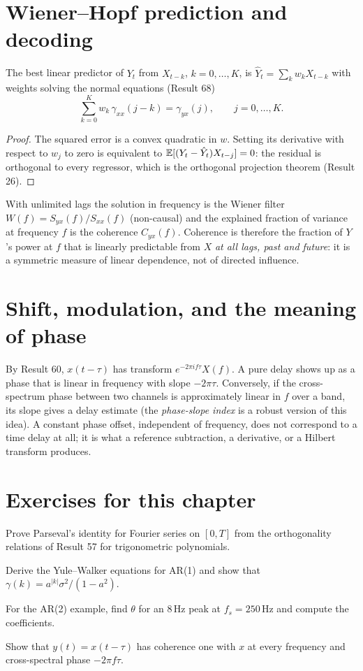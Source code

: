 \section{Wiener--Hopf prediction and decoding}
The best linear predictor of $Y_t$ from $X_{t-k}$, $k=0,\ldots,K$, is
$\hat Y_t=\sum_kw_kX_{t-k}$ with weights solving the normal equations
(Result 68)
\[
\sum_{k=0}^K w_k\,\gamma_{xx}(j-k)=\gamma_{yx}(j),\qquad j=0,\ldots,K.
\]
\begin{proof}
The squared error is a convex quadratic in $w$. Setting its derivative
with respect to $w_j$ to zero is equivalent to
$\mathbb{E}[(Y_t-\hat Y_t)X_{t-j}]=0$: the residual is orthogonal to every
regressor, which is the orthogonal projection theorem (Result 26).
\end{proof}
With unlimited lags the solution in frequency is the Wiener filter
$W(f)=S_{yx}(f)/S_{xx}(f)$ (non-causal) and the explained fraction of
variance at frequency $f$ is the coherence $C_{yx}(f)$. Coherence is
therefore the fraction of $Y$'s power at $f$ that is linearly
predictable from $X$ \emph{at all lags, past and future}: it is a
symmetric measure of linear dependence, not of directed influence.

\section{Shift, modulation, and the meaning of phase}
By Result 60, $x(t-\tau)$ has transform $e^{-2\pi if\tau}X(f)$. A pure
delay shows up as a phase that is linear in frequency with slope
$-2\pi\tau$. Conversely, if the cross-spectrum phase between two
channels is approximately linear in $f$ over a band, its slope gives a
delay estimate (the \emph{phase-slope index} is a robust version of this
idea). A constant phase offset, independent of frequency, does not
correspond to a time delay at all; it is what a reference subtraction,
a derivative, or a Hilbert transform produces.

\section*{Exercises for this chapter}
\begin{exercise}
Prove Parseval's identity for Fourier series on $[0,T]$ from the
orthogonality relations of Result 57 for trigonometric polynomials.
\end{exercise}
\begin{exercise}
Derive the Yule--Walker equations for AR(1) and show that $\gamma(k)=a^{|k|}\sigma^2/(1-a^2)$.
\end{exercise}
\begin{exercise}
For the AR(2) example, find $\theta$ for an 8\,Hz peak at $f_s=250$\,Hz
and compute the coefficients.
\end{exercise}
\begin{exercise}
Show that $y(t)=x(t-\tau)$ has coherence one with $x$ at every frequency
and cross-spectral phase $-2\pi f\tau$.
\end{exercise}

